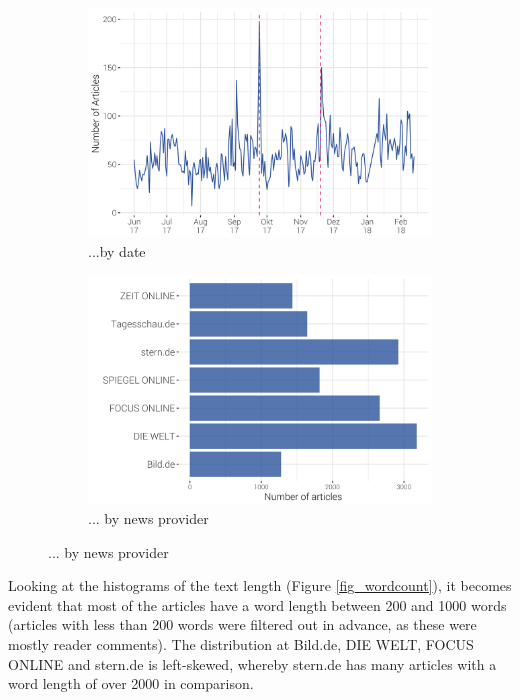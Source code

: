 \documentclass[12pt,a4paper,notitlepage]{article}
\begin{document}
\begin{figure}[H]
	\caption{Article distribution...}
	\begin{center}
		\begin{subfigure}[normla]{0.49\textwidth}
			\includegraphics[width=\textwidth]{figs/timeline.png}
			\caption{...by date}
			\label{fig_distr1}
		\end{subfigure}
		\begin{subfigure}[normla]{0.49\textwidth}
			\includegraphics[width=\textwidth]{figs/bar.png}
			\caption{... by news provider}
			\label{fig_distr2}
		\end{subfigure}
	\end{center}
\end{figure}

Looking at the histograms of the text length (Figure \ref{fig_wordcount}), it becomes evident that most of the articles have a word length between 200 and 1000 words (articles with less than 200 words were filtered out in advance, as these were mostly reader comments). The distribution at Bild.de, DIE WELT, FOCUS ONLINE and stern.de is left-skewed, whereby stern.de has many articles with a word length of over 2000 in comparison. 
\end{document}

